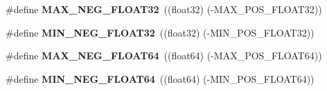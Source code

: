 \begin{DoxyCompactItemize}
\item 
\#define {\bfseries \-M\-A\-X\-\_\-\-N\-E\-G\-\_\-\-F\-L\-O\-A\-T32}~((float32) (-\/\-M\-A\-X\-\_\-\-P\-O\-S\-\_\-\-F\-L\-O\-A\-T32))\label{prim__type_8h_a28dec1bda2ada96d7126ef83feae2845}

\item 
\#define {\bfseries \-M\-I\-N\-\_\-\-N\-E\-G\-\_\-\-F\-L\-O\-A\-T32}~((float32) (-\/\-M\-I\-N\-\_\-\-P\-O\-S\-\_\-\-F\-L\-O\-A\-T32))\label{prim__type_8h_a98d8dffc8bc9036591980531b57e7f19}

\item 
\#define {\bfseries \-M\-A\-X\-\_\-\-N\-E\-G\-\_\-\-F\-L\-O\-A\-T64}~((float64) (-\/\-M\-A\-X\-\_\-\-P\-O\-S\-\_\-\-F\-L\-O\-A\-T64))\label{prim__type_8h_acb6f44b9148976581d01ab2e1313c635}

\item 
\#define {\bfseries \-M\-I\-N\-\_\-\-N\-E\-G\-\_\-\-F\-L\-O\-A\-T64}~((float64) (-\/\-M\-I\-N\-\_\-\-P\-O\-S\-\_\-\-F\-L\-O\-A\-T64))\label{prim__type_8h_a2e65d00cc854972aae6f58d9cb7d383f}

\end{DoxyCompactItemize}
